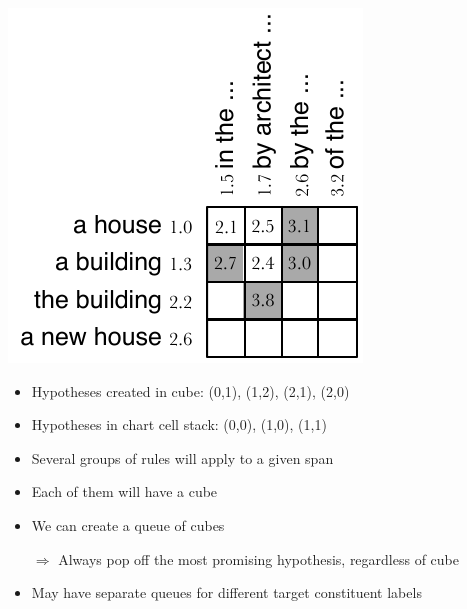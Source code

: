\documentclass[landscape]{slides}
\begin{document}

\begin{center}\vspace{2mm}
\includegraphics[scale=1.5]{cube-pruning-cube6.pdf}
\end{center}
\begin{itemize}
\item Hypotheses created in cube: (0,1), (1,2), (2,1), (2,0)
\item Hypotheses in chart cell stack: (0,0), (1,0), (1,1)
\end{itemize}


\vspace{15mm}
\begin{itemize}
\item Several groups of rules will apply to a given span
\item Each of them will have a cube
\item We can create a queue of cubes
\item[$\Rightarrow$] Always pop off the most promising hypothesis, regardless of cube
\vspace{15mm}
\item May have separate queues for different target constituent labels
\end{itemize}

\end{document}
